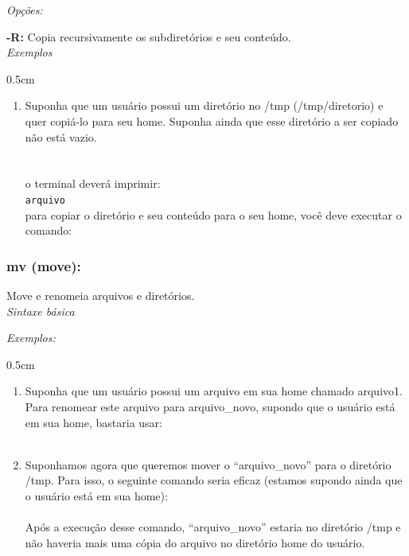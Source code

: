 \begin{refsection}
\textit{Opções:}

 \textbf{-R:} Copia recursivamente os subdiretórios e seu conteúdo.\\

\textit{Exemplos}
\begin {myindentpar}{0.5cm}
\begin{enumerate}[\itshape i.]

\item{Suponha que um usuário possui um diretório no /tmp (/tmp/diretorio) e quer copiá-lo para seu home. Suponha ainda que esse diretório a ser copiado não está vazio.}\\
 \\
 \\
o terminal deverá imprimir:\\
\userprompt{\\}
\texttt{arquivo}
\\
para copiar o diretório e seu conteúdo para o seu home, você deve executar o comando:\\

\end{enumerate}
\end{myindentpar}

\subsubsection{mv (move):}\label{tut1:text_mode:commands:mv}

 Move e renomeia arquivos e diretórios.\\

\textit{Sintaxe básica}


\textit{Exemplos:}
\begin {myindentpar}{0.5cm}
\begin{enumerate}[\itshape i.]

\item{Suponha que um usuário possui um arquivo em sua home chamado arquivo1. Para renomear este arquivo para arquivo\_novo, supondo que o usuário está em sua home, bastaria usar:}
\\
 \\
\item{Suponhamos agora que queremos mover o ``arquivo\_novo'' para o diretório /tmp. Para isso, o seguinte comando seria eficaz (estamos supondo ainda que o usuário está em sua home):}
\\
 \\
 Após a execução desse comando, ``arquivo\_novo'' estaria no diretório /tmp e não haveria mais uma cópia do arquivo no diretório home do usuário.\\


\end{enumerate}
\end{myindentpar}
\end{refsection}
